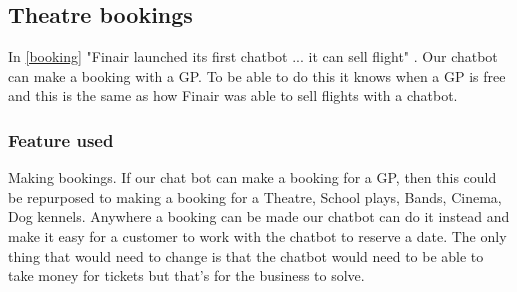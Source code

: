 \documentclass{article}
\begin{document}
\subsection{Theatre bookings}
In \ref{booking} "Finair launched its first chatbot ... it can sell flight" \cite{booking}. Our chatbot can make a booking with a GP. To be able to do this it knows when a GP is free and  this is the same as how Finair was able to sell flights with a chatbot. 
\subsubsection{Feature used}
Making bookings. If our chat bot can make a booking for a GP, then this could be repurposed to making a booking for a Theatre, School plays, Bands, Cinema, Dog kennels.
Anywhere a booking can be made our chatbot can do it instead and make it easy for a customer to work with the chatbot to reserve a date. The only thing that would need to change is that the chatbot would need to be able to take money for tickets but that's for the business to solve.


\end{document}
